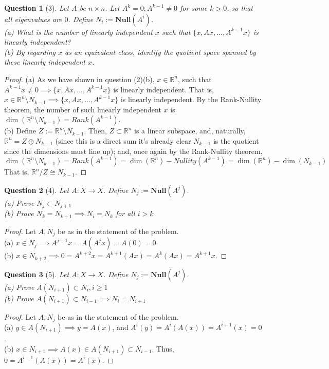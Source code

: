 \documentclass[11pt]{article}
\theoremstyle{quest}
\newtheorem*{question}{Question}
\begin{document}
\begin{question}[3]
Let $A$ be $n \times n$. Let $A^k = 0; A^{k-1} \ne 0$ for some $k > 0$, so that all eigenvalues are $0$. Define $N_i := \mathbf{Null}(A^i)$.
\\(a) What is the number of linearly independent $x$ such that $\{x, Ax, \ldots, A^{k-1}x\}$ is linearly independent?
\\(b) By regarding $x$ as an equivalent class, identify the quotient space spanned by these linearly independent $x$. 
\end{question}
\begin{proof}
(a) As we have shown in question (2)(b), $x \in \mathbb{R}^n$, such that $A^{k-1} x \ne 0 \implies \{x, Ax, \ldots, A^{k-1}x\}$ is linearly independent. That is, $x \in \mathbb{R}^n \setminus N_{k-1} \implies \{x, Ax, \ldots, A^{k-1}x\}$ is linearly independent. By the Rank-Nullity theorem, the number of such linearly independent $x$ is $\dim(\mathbb{R}^n \setminus N_{k-1}) = Rank(A^{k-1})$.
\\(b) Define $Z := \mathbb{R}^n \setminus N_{k-1}$. Then, $Z \subset \mathbb{R}^n$ is a linear subspace, and, naturally, $\mathbb{R}^n = Z \oplus N_{k-1}$ (since this is a direct sum it's already clear $N_{k-1}$ is the quotient since the dimensions must line up); and, once again by the Rank-Nullity theorem, $$\dim(\mathbb{R}^n \setminus N_{k-1}) = Rank(A^{k-1}) = \dim(\mathbb{R}^n) - Nullity(A^{k-1}) = \dim(\mathbb{R}^n) - \dim(N_{k-1})$$
That is, $\mathbb{R}^n / Z \cong N_{k-1}$.
\end{proof}
\begin{question}[4]
Let $A: X \rightarrow X$. Define $N_j := \mathbf{Null}(A^j)$.
\\(a) Prove $N_j \subset N_{j+1}$
\\(b) Prove $N_k = N_{k+1} \implies N_i = N_k$ for all $i > k$
\end{question}
\begin{proof}
  Let $A, N_j$ be as in the statement of the problem.
  \\(a) $x \in N_j \implies A^{j+1}x = A(A^j x) = A(0) = 0$.
  \\(b) $x \in N_{k+2} \implies 0 = A^{k+2}x = A^{k+1}(Ax) = A^k(Ax) = A^{k+1}x$.
\end{proof}
\begin{question}[5]
Let $A: X \rightarrow X$. Define $N_j := \mathbf{Null}(A^j)$.
\\(a) Prove $A(N_{i+1}) \subset N_i, i \ge 1$
\\(b) Prove $A(N_{i+1}) \subset N_{i-1} \implies N_i = N_{i+1}$
\end{question}
\begin{proof}
Let $A, N_j$ be as in the statement of the problem.
  \\(a) $y \in A(N_{i+1}) \implies y = A(x)$, and $A^i(y) = A^i(A(x)) = A^{i+1}(x) = 0$.
  \\(b) $x \in N_{i+1} \implies A(x) \in A(N_{i+1}) \subset N_{i-1}$. Thus, $0 = A^{i-1}(A(x)) = A^i(x)$.
\end{proof}
\end{document}
